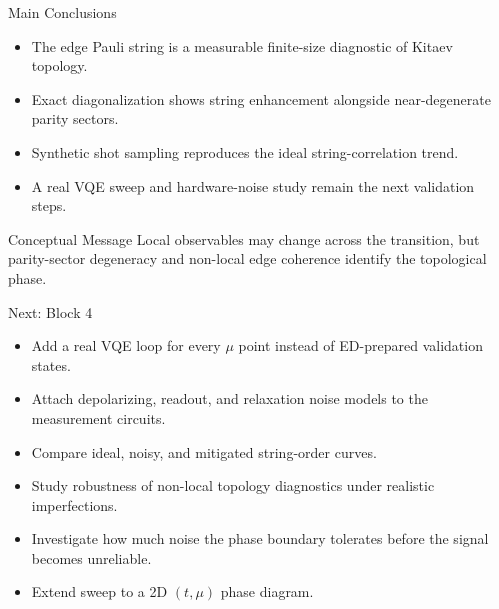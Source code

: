 \documentclass[aspectratio=169, 12pt]{beamer}
\begin{document}
\begin{frame}{Main Conclusions}

  \begin{itemize}
    \item The edge Pauli string is a measurable finite-size diagnostic of Kitaev topology.
    \item Exact diagonalization shows string enhancement alongside near-degenerate parity sectors.
    \item Synthetic shot sampling reproduces the ideal string-correlation trend.
    \item A real VQE sweep and hardware-noise study remain the next validation steps.
  \end{itemize}

  \vspace{0.4cm}

  \begin{block}{Conceptual Message}
    Local observables may change across the transition, but parity-sector
    degeneracy and non-local edge coherence identify the topological phase.
  \end{block}

\end{frame}


\begin{frame}{Next: Block 4}

  \begin{itemize}
    \item Add a real VQE loop for every $\mu$ point instead of ED-prepared validation states.

    \item Attach depolarizing, readout, and relaxation noise models to the measurement circuits.

    \item Compare ideal, noisy, and mitigated string-order curves.

    \item Study robustness of non-local topology diagnostics under realistic imperfections.

    \item Investigate how much noise the phase boundary tolerates before the signal becomes unreliable.

    \item Extend sweep to a 2D $(t, \mu)$ phase diagram.

  \end{itemize}

\end{frame}

\end{document}
